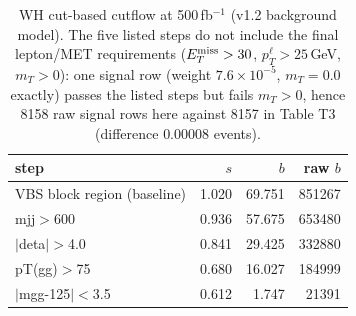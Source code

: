 \begin{table}[ht]\centering\small
\begin{tabular}{lrrr}\hline
step & $s$ & $b$ & raw $b$ \\\hline
VBS block region (baseline) & 1.020 & 69.751 & 851267 \\
mjj$>$600 & 0.936 & 57.675 & 653480 \\
$|$deta$|$$>$4.0 & 0.841 & 29.425 & 332880 \\
pT(gg)$>$75 & 0.680 & 16.027 & 184999 \\
$|$mgg-125$|$$<$3.5 & 0.612 & 1.747 & 21391 \\\hline
\end{tabular}
\caption{WH cut-based cutflow at 500\,fb$^{-1}$ (v1.2 background model). The five listed steps do not include the final lepton/MET requirements ($E_T^{\rm miss}>30$, $p_T^\ell>25$\,GeV, $m_T>0$): one signal row (weight $7.6\times10^{-5}$, $m_T=0.0$ exactly) passes the listed steps but fails $m_T>0$, hence 8158 raw signal rows here against 8157 in Table T3 (difference $0.00008$ events).}
\end{table}
